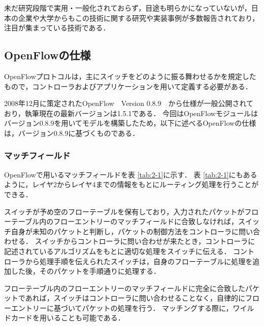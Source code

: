 未だ研究段階で実用・一般化されておらず，目途も明らかになっていないが，日本の企業や大学からもこの技術に関する研究や実装事例が多数報告されており，注目が集まっている技術である．

\subsection{OpenFlowの仕様}

OpenFlowプロトコルは，主にスイッチをどのように振る舞わせるかを規定したもので，コントローラおよびアプリケーションを用いて定義する必要がある．

2008年12月に策定されたOpenFlow　Version 0.8.9\cite{openflow}　から仕様が一般公開されており，執筆現在の最新バージョンは1.5.1である．
今回はOpenFlowモジュールはバージョン0.8.9を用いてモデルを構築したため，以下に述べるOpenFlowの仕様は，バージョン0.8.9に基づくものである．

\subsubsection{マッチフィールド}

OpenFlowで用いるマッチフィールドを表 \ref{tab:2-1}に示す\cite{openflow}．
表 \ref{tab:2-1}にもあるように，レイヤ2からレイヤ4までの情報をもとにルーティング処理を行うことができる．

スイッチが予め空のフローテーブルを保有しており，入力されたパケットがフローテーブル内のフローエントリーのマッチフィールドに合致しなければ，スイッチ自身が未知のパケットと判断し，パケットの制御方法をコントローラに問い合わせる．
スイッチからコントローラに問い合わせが来たとき，コントローラに記述されているアルゴリズムをもとに適切な処理をスイッチに伝える．
コントローラから処理手順を伝えられたスイッチは，自身のフローテーブルに処理を追加した後，そのパケットを手順通りに処理する．

フローテーブル内のフローエントリーのマッチフィールドに完全に合致したパケットであれば，スイッチはコントローラに問い合わせることなく，自律的にフローエントリーに基づいてパケットの処理を行う．
マッチングする際に，ワイルドカードを用いることも可能である．

